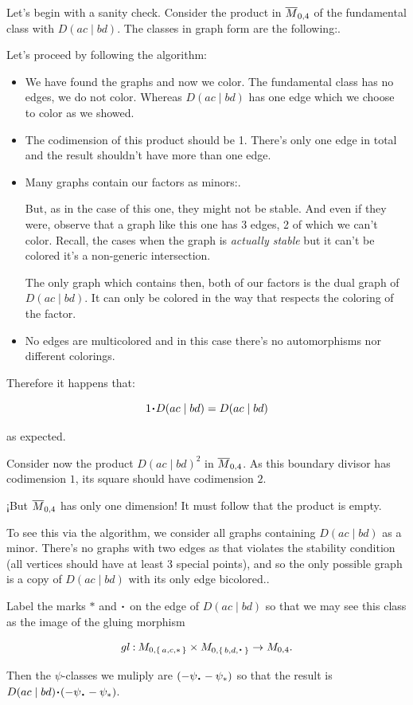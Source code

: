 \documentclass[12pt]{memoir}
\begin{document}
\begin{Ex}
    Let's begin with a sanity check. Consider the product in \(\overline M_{0,4}\) of the fundamental class with \(D(ac\mid bd)\). The classes in graph form are the following:.\par
    Let's proceed by following the algorithm:
    \begin{itemize}
        \item We have found the graphs and now we color. The fundamental class has no edges, we do not color. Whereas \(D(ac\mid bd)\) has one edge which we choose to color as we showed.
        \item The codimension of this product should be 1. There's only one edge in total and the result shouldn't have more than one edge.
        \item Many graphs contain our factors as minors:.\par
              But, as in the case of this one, they might not be stable. And even if they were, observe that a graph like this one has 3 edges, 2 of which we can't color. Recall, the cases when the graph is \emph{actually stable} but it can't be colored it's a non-generic intersection.\par
              The only graph which contains then, both of our factors is the dual graph of \(D(ac\mid bd)\). It can only be colored in the way that respects the coloring of the factor.
        \item No edges are multicolored and in this case there's no automorphisms nor different colorings.
    \end{itemize}
    Therefore it happens that:

    \[1\.D(ac\mid bd)=D(ac\mid bd)\]

    as expected.
\end{Ex}

\begin{Ex}
    Consider now the product \(D(ac\mid bd)^2\) in \(\overline{M}_{0,4}\). As this boundary divisor has codimension \(1\), its square should have codimension \(2\).\par
    ¡But \(\overline{M}_{0,4}\) has only one dimension! It must follow that the product is empty.\par
    To see this via the algorithm, we consider all graphs containing \(D(ac\mid bd)\) as a minor. There's no graphs with two edges as that violates the stability condition (all vertices should have at least 3 special points), and so the only possible graph is a copy of \(D(ac\mid bd)\) with its only edge bicolored..\par
    Label the marks \(\ast\) and \(\.\) on the edge of \(D(ac\mid bd)\) so that we may see this class as the image of the gluing morphism

    \[gl\: M_{0,\set{a,c,\ast}}\x M_{0,\set{b,d,\.}}\to M_{0,4}.\]

    Then the \(\psi\)-classes we muliply are \((-\psi_{\.}-\psi_{\ast})\) so that the result is \(D(ac\mid bd)\.(-\psi_{\.}-\psi_{\ast})\).\par
\end{Ex}
\end{document}
